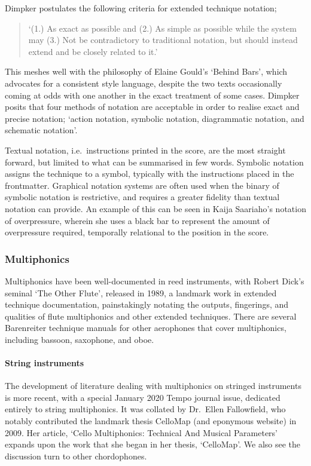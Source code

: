 Dimpker postulates the following criteria for extended technique notation; \begin{quote}
    `(1.) As exact as possible and (2.) As simple as possible while the system may (3.) Not be contradictory to
traditional notation, but should instead extend and be closely related to it.'\autocite[3]{dimpkerExtendedNotationDepiction2012}
\end{quote}
This meshes well with the philosophy of Elaine Gould's `Behind Bars', which advocates for a consistent style language, despite the two texts occasionally coming at odds with one another in the exact treatment of some cases.\autocite[120--121, 61]{dimpkerExtendedNotationDepiction2012,gouldBars2011}
Dimpker posits that four methods of notation are acceptable in order to realise exact and precise notation; `action notation, symbolic notation, diagrammatic notation, and schematic notation'.\autocite[33]{dimpkerExtendedNotationDepiction2012}

Textual notation, i.e.\ instructions printed in the score, are the most straight forward, but limited to what can be summarised in few words.
Symbolic notation assigns the technique to a symbol, typically with the instructions placed in the frontmatter.
Graphical notation systems are often used when the binary of symbolic notation is restrictive, and requires a greater fidelity than textual notation can provide. 
An example of this can be seen in Kaija Saariaho's notation of overpressure, wherein she uses a black bar to represent the amount of overpressure required, temporally relational to the position in the score.\autocite{TODO: saariaho citation}


\subsubsection{Multiphonics}
Multiphonics have been well-documented in reed instruments, with Robert Dick's seminal `The Other Flute', released in 1989, a landmark work in extended technique documentation, painstakingly notating the outputs, fingerings, and qualities of flute multiphonics and other extended techniques.\autocite{dickOtherFlute1989}
There are several Barenreiter technique manuals for other aerophones that cover multiphonics, including bassoon, saxophone, and oboe.\autocite{weissTechniquesSaxophonePlaying2010,galloisTechniquesBassoonPlaying2009, TODO:OboeBook}

\paragraph{String instruments}
The development of literature dealing with multiphonics on stringed instruments is more recent, with a special January 2020 Tempo journal issue, dedicated entirely to string multiphonics.
It was collated by Dr.\ Ellen Fallowfield, who notably contributed the landmark thesis CelloMap (and eponymous website) in 2009.\autocite{fallowfieldCelloMapHandbook2009, fallowfieldCelloMap}
Her article, `Cello Multiphonics: Technical And Musical Parameters' expands upon the work that she began in her thesis, `CelloMap'.\autocite{fallowfieldCelloMultiphonicsTechnical2020}
We also see the discussion turn to other chordophones.

